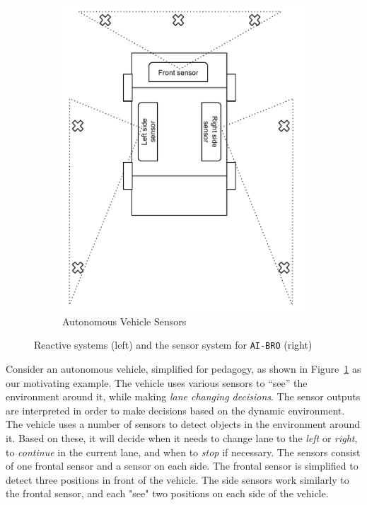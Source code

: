 \begin{figure}[h]
\begin{subfigure}[h]{0.4\textwidth}
		\includegraphics[width = \textwidth]{Content/fig/AutoVehicle.pdf}
		\captionsetup{justification=centering}
		\caption{Autonomous Vehicle Sensors}
		\label{fig:avimg}
	\end{subfigure}
	
	\caption{Reactive systems (left) and the sensor system for \texttt{AI-BRO} (right)}
	\label{fig:reactive-aibro}
\end{figure}

Consider an autonomous vehicle, simplified for pedagogy, as shown in Figure~\ref{fig:avimg} as our motivating example.
The vehicle uses various sensors  to ``see'' the environment around it, while making \emph{lane changing decisions}. 
The sensor outputs are interpreted in order to make decisions based on the dynamic environment. 
The vehicle uses a number of sensors to detect objects in the environment around it. Based on these, it will decide when it needs to change lane
to the \emph{left} or \emph{right}, to \emph{continue} in the current lane, and when to \emph{stop} if necessary. 
The sensors consist of one frontal sensor and a sensor on each side.
The frontal sensor is simplified to detect three positions in front of the vehicle. The side sensors work similarly to the frontal sensor,
and each "see" two positions on each side of the vehicle. 

